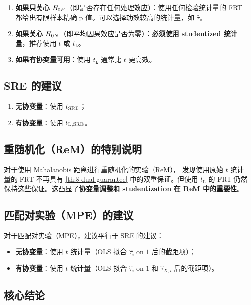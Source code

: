 \begin{enumerate}
  \item \textbf{如果只关心 $H_{0F}$}（即是否存在任何处理效应）：使用任何检验统计量的 FRT 都给出有限样本精确 p 值。可以选择功效较高的统计量，如 $\hat\tau$。
  \item \textbf{如果关心 $H_{0N}$}（即平均因果效应是否为零）：\textbf{必须使用 studentized 统计量}，推荐使用 $t$ 或 $t_\mathrm{L}$。
  \item \textbf{如果有协变量可用}：使用 $t_\mathrm{L}$ 通常比 $t$ 更高效。
\end{enumerate}

\subsection{SRE 的建议}
\label{sec:8-sre-recommendations}

\begin{enumerate}
  \item \textbf{无协变量}：使用 $t_{\text{SRE}}$；
  \item \textbf{有协变量}：使用 $t_{\mathrm{L},\text{SRE}}$。
\end{enumerate}

\subsection{重随机化（ReM）的特别说明}
\label{sec:8-rem-note}

对于使用 Mahalanobis 距离进行重随机化的实验（ReM），\citet{ZhaoDing:2021a} 发现使用原始 $t$ 统计量的 FRT 不再具有 \cref{th:8-dual-guarantee} 中的双重保证。但使用 $t_\mathrm{L}$ 的 FRT 仍然保持这些保证。这凸显了\textbf{协变量调整和 studentization 在 ReM 中的重要性}。

\subsection{匹配对实验（MPE）的建议}
\label{sec:8-mpe-recommendations}

对于匹配对实验（MPE），建议平行于 SRE 的建议：
\begin{itemize}
  \item \textbf{无协变量}：使用 $t$ 统计量（OLS 拟合 $\hat\tau_i$ on $1$ 后的截距项）；
  \item \textbf{有协变量}：使用 $t$ 统计量（OLS 拟合 $\hat\tau_i$ on $1$ 和 $\hat\tau_{X,i}$ 后的截距项）。
\end{itemize}

\subsection{核心结论}
\label{sec:8-core-conclusion}

